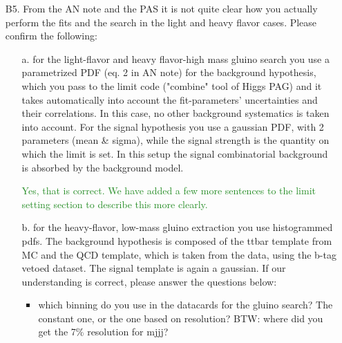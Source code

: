 \documentclass[paper=a4, fontsize=11pt]{scrartcl}
\begin{document}
\begin{itemize}
\begin{itemize}
\textcolor{ForestGreen}{The requested plots have been added to the AN. The "Acceptance" section has been rephrased to include your suggested definition. For higher masses, a change in diagonal cut has very little effect on f3 (the ratio of Gaussian triplets over all triplets), as can be seen in Figure~\ref{fig:diffdelta} where three different $\Delta$ cuts are chosen and f3 is shown.}

\begin{figure}[ht]
 \begin{center}
 \texttt{[image: RPV112\_f3\_for\_different\_diagcuts.pdf]}
         \caption{f3 is shown for different $\Delta$ cuts as a function of gluino mass. Changing $\Delta$ only has a very small effect for higher masses where the method becomes less successful in picking out a resonance peak.}
   \label{fig:diffdelta}
 \end{center}
\end{figure}

\end{itemize}

\item[B5.] From the AN note and the PAS it is not quite clear how you actually perform the fits
and the search in the light and heavy flavor cases. Please confirm the following: 
\begin{itemize}
\item[a.] for the light-flavor and heavy flavor-high mass gluino search you use a parametrized PDF (eq. 2 in AN note) for the background hypothesis, which you pass to the limit code ("combine" tool of Higgs PAG) and it takes automatically into account the fit-parameters' uncertainties and their correlations. In this case, no other background systematics is taken into account. For the signal hypothesis you use a gaussian PDF, with 2 parameters (mean \& sigma), while the signal strength is the quantity on which the limit is set. In this setup the signal combinatorial background is absorbed by the background model.

\textcolor{ForestGreen}{Yes, that is correct. We have added a few more sentences to the limit setting section to describe this more clearly.}\\

\item[b.] for the heavy-flavor, low-mass gluino extraction you use histogrammed pdfs. The background hypothesis is composed of the ttbar template from MC and the QCD template, which is taken from the data, using the b-tag vetoed dataset. The signal template is again a gaussian.
If our understanding is correct, please answer the questions below: 
\begin{itemize}
\item which binning do you use in the datacards for the gluino search? The constant one, or the one based on resolution? BTW: where did you get the 7\% resolution for mjjj? 


\end{itemize}
\end{itemize}
\end{itemize}
\end{document}
